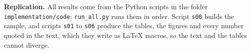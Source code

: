 \documentclass[11pt]{article}
\begin{document}
\noindent\textbf{Replication.} All results come from the Python scripts in the folder
\texttt{implementation/code}; \texttt{run\_all.py} runs them in order. Script \texttt{s00} builds the sample, and
scripts \texttt{s01} to \texttt{s06} produce the tables, the figures and every number quoted in the text, which they
write as \LaTeX{} macros, so the text and the tables cannot diverge.
\end{document}
